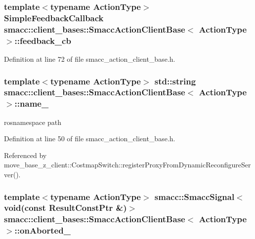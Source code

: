 \subsubsection[{\texorpdfstring{feedback\+\_\+cb}{feedback_cb}}]{\setlength{\rightskip}{0pt plus 5cm}template$<$typename Action\+Type$>$ {\bf Simple\+Feedback\+Callback} {\bf smacc\+::client\+\_\+bases\+::\+Smacc\+Action\+Client\+Base}$<$ Action\+Type $>$\+::feedback\+\_\+cb}\hypertarget{classsmacc_1_1client__bases_1_1SmaccActionClientBase_a978629b407530f1b7d266a009eff664b}{}\label{classsmacc_1_1client__bases_1_1SmaccActionClientBase_a978629b407530f1b7d266a009eff664b}


Definition at line 72 of file smacc\+\_\+action\+\_\+client\+\_\+base.\+h.

\subsubsection[{\texorpdfstring{name\+\_\+}{name_}}]{\setlength{\rightskip}{0pt plus 5cm}template$<$typename Action\+Type$>$ std\+::string {\bf smacc\+::client\+\_\+bases\+::\+Smacc\+Action\+Client\+Base}$<$ Action\+Type $>$\+::name\+\_\+}\hypertarget{classsmacc_1_1client__bases_1_1SmaccActionClientBase_a7f2e1834e915bdf7ae9db8b90b4597e6}{}\label{classsmacc_1_1client__bases_1_1SmaccActionClientBase_a7f2e1834e915bdf7ae9db8b90b4597e6}


rosnamespace path 



Definition at line 50 of file smacc\+\_\+action\+\_\+client\+\_\+base.\+h.



Referenced by move\+\_\+base\+\_\+z\+\_\+client\+::\+Costmap\+Switch\+::register\+Proxy\+From\+Dynamic\+Reconfigure\+Server().

\subsubsection[{\texorpdfstring{on\+Aborted\+\_\+}{onAborted_}}]{\setlength{\rightskip}{0pt plus 5cm}template$<$typename Action\+Type$>$ {\bf smacc\+::\+Smacc\+Signal}$<$void(const Result\+Const\+Ptr \&)$>$ {\bf smacc\+::client\+\_\+bases\+::\+Smacc\+Action\+Client\+Base}$<$ Action\+Type $>$\+::on\+Aborted\+\_\+}\hypertarget{classsmacc_1_1client__bases_1_1SmaccActionClientBase_adc33748ca4fcef9730f8039b75d496d0}{}\label{classsmacc_1_1client__bases_1_1SmaccActionClientBase_adc33748ca4fcef9730f8039b75d496d0}


